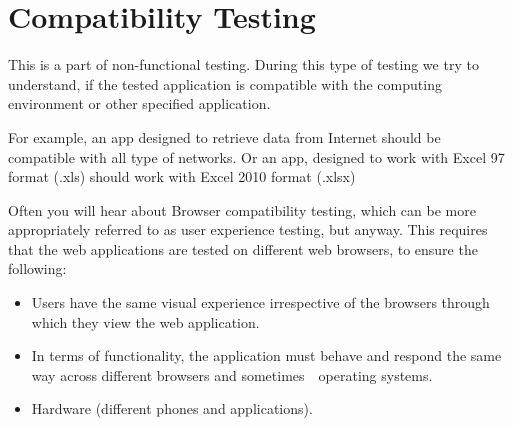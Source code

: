 \section{Compatibility Testing}
\label{sec:Compatibility Testing}

This is a part of non-functional testing. During this type of testing we try to understand, if the tested application is compatible with the computing environment or other specified application.

For example, an app designed to retrieve data from Internet should be compatible with all type of networks. Or an app, designed to work with Excel 97 format (.xls) should work with Excel 2010 format (.xlsx)

Often you will hear about Browser compatibility testing, which can be more appropriately referred to as user experience testing, but anyway. This requires that the web applications are tested on different web browsers, to ensure the following:

\begin{itemize}
\item 
    Users have the same visual experience irrespective of the browsers through which they view the web application.
\item 
    In terms of functionality, the application must behave and respond the same way across different browsers and sometimes~\textemdash~operating systems.
\item 
    Hardware (different phones and applications).                                                 \end{itemize}
